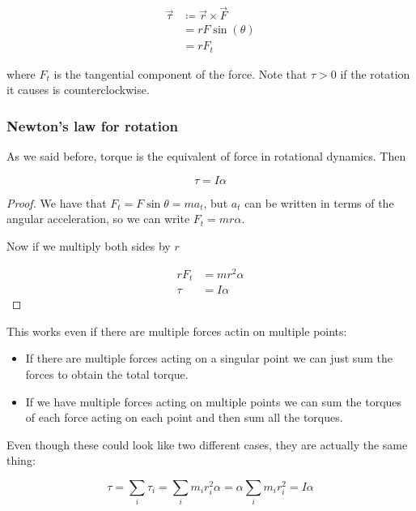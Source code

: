 \documentclass[14pt]{extarticle}
\begin{document}
\begin{align}
    \vec{\tau} & \coloneq \vec{r} \times \vec{F} \\
               & = r F \sin(\theta)              \\
               & = r F_t
\end{align}

where $F_t$ is the tangential component of the force.
Note that $\tau > 0$ if the rotation it causes is counterclockwise.

\subsubsection{Newton's law for rotation}

As we said before, torque is the equivalent of force in rotational dynamics. Then

\begin{theorem}
    \begin{equation}
        \tau = I \alpha
    \end{equation}
\end{theorem}

\begin{proof}
    We have that $F_t = F \sin \theta = m a_t$, but $a_t$ can be written in terms of the angular acceleration, so we can write $F_t = m r \alpha$.

    Now if we multiply both sides by $r$

    \begin{align}
        r F_t & = m r^2 \alpha \\
        \tau  & = I \alpha
    \end{align}
\end{proof}

This works even if there are multiple forces actin on multiple points:
\begin{itemize}
    \item If there are multiple forces acting on a singular point we can just sum the forces to obtain the total torque.
    \item If we have multiple forces acting on multiple points we can sum the torques of each force acting on each point and then sum all the torques.
\end{itemize}

Even though these could look like two different cases, they are actually the same thing:

\begin{equation}
    \tau = \sum_i \tau_i = \sum_i m_i r_i^2 \alpha = \alpha \sum_i m_i r_i^2 = I \alpha
\end{equation}
\end{document}
